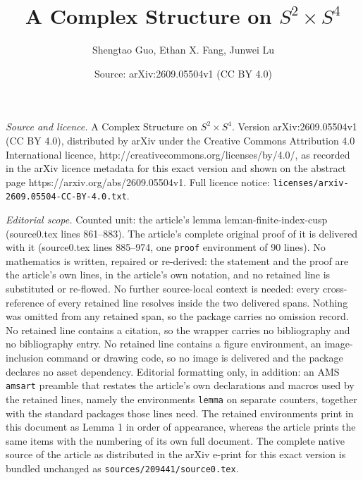 \documentclass[10pt,a4paper]{amsart}
\title{\normalfont\LARGE A Complex Structure on $S^2\times S^4$}
\author{Shengtao Guo, Ethan X. Fang, Junwei Lu}
\date{Source: arXiv:2609.05504v1 (CC BY 4.0)}
\begin{document}
\maketitle

\noindent\emph{Source and licence.} \normalfont\LARGE A Complex Structure on $S^2\times S^4$. Version arXiv:2609.05504v1 (CC BY 4.0), distributed by arXiv under the Creative Commons Attribution 4.0 International licence, http://creativecommons.org/licenses/by/4.0/, as recorded in the arXiv licence metadata for this exact version and shown on the abstract page https://arxiv.org/abs/2609.05504v1. Full licence notice: \texttt{licenses/arxiv-2609.05504-CC-BY-4.0.txt}.\par\smallskip

\noindent\textit{Editorial scope.} Counted unit: the article's lemma lem:an-finite-index-cusp (source0.tex lines 861--883). The article's complete original proof of it is delivered with it (source0.tex lines 885--974, one \texttt{proof} environment of 90 lines). No mathematics is written, repaired or re-derived: the statement and the proof are the article's own lines, in the article's own notation, and no retained line is substituted or re-flowed.  No further source-local context is needed: every cross-reference of every retained line resolves inside the two delivered spans.  Nothing was omitted from any retained span, so the package carries no omission record.  No retained line contains a citation, so the wrapper carries no bibliography and no bibliography entry.  No retained line contains a figure environment, an image-inclusion command or drawing code, so no image is delivered and the package declares no asset dependency.  Editorial formatting only, in addition: an AMS \texttt{amsart} preamble that restates the article's own declarations and macros used by the retained lines, namely the environments \texttt{lemma} on separate counters, together with the standard packages those lines need.  The retained environments print in this document as Lemma 1 in order of appearance, whereas the article prints the same items with the numbering of its own full document.  The complete native source of the article as distributed in the arXiv e-print for this exact version is bundled unchanged as \texttt{sources/209441/source0.tex}.
\end{document}
